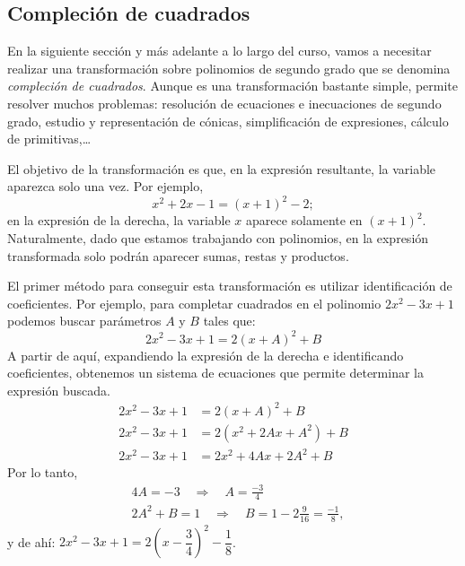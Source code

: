 \subsection{Compleción de cuadrados}\label{ss:comp-cuadr}

En la siguiente sección y más adelante a lo largo del curso, vamos a necesitar realizar una transformación sobre polinomios de segundo grado que se denomina \emph{compleción de cuadrados}.
Aunque es una transformación bastante simple, permite resolver muchos problemas: resolución de ecuaciones e inecuaciones de segundo grado, estudio y representación de cónicas, simplificación de expresiones, cálculo de primitivas,\dots

El objetivo de la transformación es que, en la expresión resultante, la variable aparezca solo una vez.
Por ejemplo,
\[
x^2+2x-1 = (x+1)^2-2;
\]
en la expresión de la derecha, la variable $x$ aparece solamente en $(x+1)^2$.
Naturalmente, dado que estamos trabajando con polinomios, en la expresión transformada solo podrán aparecer sumas, restas y productos.
%
\begin{ejemplo}
El primer método para conseguir esta transformación es utilizar identificación de coeficientes.
Por ejemplo, para completar cuadrados en el polinomio $2x^2-3x+1$ podemos buscar parámetros $A$ y $B$ tales que:
\[
2x^2-3x+1 = 2(x+A)^2+B
\]
A partir de aquí, expandiendo la expresión de la derecha e identificando coeficientes, obtenemos un sistema de ecuaciones que permite determinar la expresión buscada.
%
\begin{align*}
2x^2-3x+1 &= 2(x+A)^2+B\\
2x^2-3x+1 &= 2(x^2+2Ax+A^2)+B\\
2x^2-3x+1 &= 2x^2+4Ax+2A^2+B
\end{align*}
Por lo tanto, 
\begin{align*}
&4A=-3\quad \Rightarrow\quad A=\frac{-3}4\\
&2A^2+B = 1\quad \Rightarrow\quad B=1-2\frac9{16}=\frac{-1}8,
\end{align*}
y de ahí: $2x^2-3x+1 = 2\left(x-\dfrac34\right)^2-\dfrac18$.\fej
\end{ejemplo}

